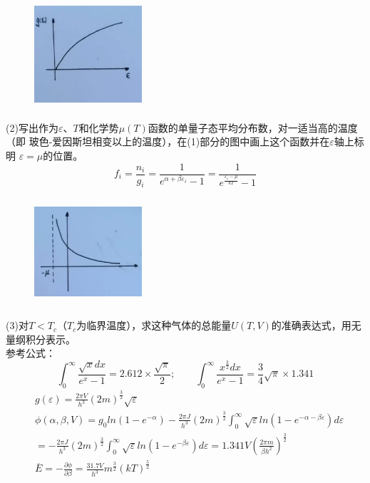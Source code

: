 \documentclass[UTF8]{ctexart}
\begin{document}
\begin{figure}[H]
  \centering
  \includegraphics[width=4cm,height=4cm]{5_3_1.jpg}
\end{figure}
(2)写出作为$\varepsilon$、$T$和化学势$\mu(T)$函数的单量子态平均分布数，对一适当高的温度（即
玻色-爱因斯坦相变以上的温度），在(1)部分的图中画上这个函数并在$\varepsilon$轴上标明
$\varepsilon=\mu$的位置。
\begin{equation*}
  f_i=\frac{n_i}{g_i}=\frac{1}{e^{\alpha+\beta\varepsilon_i}-1}
  =\frac{1}{e^\frac{\varepsilon_i-\mu}{kT}-1}
\end{equation*}
\begin{figure}[H]
  \centering
  \includegraphics[width=4cm,height=4cm]{5_3_2.jpg}
\end{figure}
(3)对$T<T_c$（$T_c$为临界温度），求这种气体的总能量$U(T,V)$的准确表达式，用无量纲积分表示。\\
参考公式：
\begin{equation*}
  \int_0^\infty\frac{\sqrt{x}dx}{e^x-1}=2.612\times\frac{\sqrt{\pi}}{2};\quad\quad
  \int_0^\infty\frac{x^\frac{3}{2}dx}{e^x-1}=\frac{3}{4}\sqrt{\pi}\times1.341
\end{equation*}
\begin{equation*}
  \begin{aligned}
     & g(\varepsilon)=\frac{2\pi V}{h^3}(2m)^\frac{3}{2}\sqrt{\varepsilon}          \\
     & \phi(\alpha,\beta,V)=g_0ln(1-e^{-\alpha})-\frac{2\pi J}{h^3}(2m)^\frac{3}{2}
    \int_0^\infty\sqrt{\varepsilon}ln(1-e^{-\alpha-\beta\varepsilon})d\varepsilon   \\
     & =-\frac{2\pi J}{h^3}(2m)^\frac{3}{2}
    \int_0^\infty\sqrt\varepsilon ln(1-e^{-\beta\varepsilon})d\varepsilon
    =1.341V(\frac{2\pi m}{\beta h^2})^\frac{3}{2}                                   \\
     & \overline{E}=-\frac{\partial\phi}{\partial\beta}
    =\frac{31.7V}{h^3}m^\frac{3}{2}(kT)^\frac{5}{2}
  \end{aligned}
\end{equation*}
\end{document}
